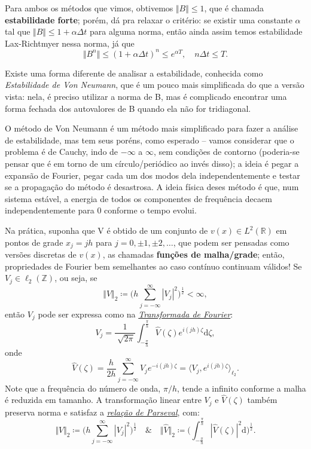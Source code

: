 \documentclass[../differential_methods.tex]{subfiles}
\begin{document}
Para ambos os métodos que vimos, obtivemos \(\Vert B \Vert \leq 1\), que é chamada \textbf{estabilidade forte}; porém, dá pra relaxar o critério: se existir uma constante \(\alpha \) tal que \(\Vert B \Vert \leq 1 + \alpha \Delta t\) para alguma norma, então ainda assim temos estabilidade Lax-Richtmyer nessa norma, já que
\[
	\Vert B^{n} \Vert \leq (1+\alpha \Delta t)^{n} \leq e^{\alpha T}, \quad n\Delta t\leq T.
\]

Existe uma forma diferente de analisar a estabilidade, conhecida como \textit{Estabilidade de Von Neumann}, que é um pouco mais simplificada do que a versão vista: nela, é preciso utilizar a norma de B, mas é complicado encontrar uma forma fechada dos autovalores de B quando ela não for tridiagonal.

O método de Von Neumann é um método mais simplificado para fazer a análise de estabilidade, mas tem seus poréns, como esperado -- vamos considerar que o problema é de Cauchy, indo de \(-\infty\) a \(\infty\), sem condições de contorno (poderia-se pensar que é em torno de um círculo/periódico ao invés disso); a ideia é pegar a expansão de Fourier, pegar cada um dos modos dela independentemente e testar se a propagação do método é desastrosa.
A ideia física deses método é que, num sistema estável, a energia de todos os componentes de frequência decaem independentemente para 0 conforme o tempo evolui.

Na prática, suponha que V é obtido de um conjunto de \(v(x)\in L^{2}(\mathbb{R})\) em pontos de grade \(x_{j}=jh\) para \(j=0, \pm 1, \pm 2, \dotsc \), que podem ser pensadas como versões discretas de \(v(x)\), as chamadas \textbf{funções de malha/grade}; então, propriedades de Fourier bem semelhantes ao caso contínuo continuam válidos!
Se \(V_{j}\in \ell_{2}(\mathbb{Z})\), ou seja, se
\[
	\Vert V \Vert_{2}\coloneqq \biggl(h \sum\limits_{j=-\infty}^{\infty}| V_{j} |^{2}\biggr)^{\frac{1}{2}} < \infty,
\]
então \(V_{j}\) pode ser expressa como na \hyperlink{fourier_transform}{\textit{Transformada de Fourier}}:
\[
	V_{j} = \frac{1}{\sqrt[]{2\pi }}\int_{-\frac{\pi }{h}}^{\frac{\pi }{h}}\hat{V}(\zeta )e^{i(jh)\zeta } \mathrm{d}\zeta,
\]
onde
\[
	\hat{V}(\zeta ) = \frac{h}{2h}\sum\limits_{j=-\infty}^{\infty}V_{j}e^{-i(jh)\zeta } = \langle V_{j}, e^{i(jh)\zeta } \rangle_{\ell_{2}}.
\]
Note que a frequência do número de onda, \(\pi /h\), tende a infinito conforme a malha é reduzida em tamanho.
A transformação linear entre \(V_{j}\) e \(\hat{V}(\zeta )\) também preserva norma e satisfaz a \hyperlink{parseval_relation}{\textit{relação de Parseval}}, com:
\[
	\Vert V \Vert_{2} \coloneqq \biggl(h \sum\limits_{j=-\infty}^{\infty}| V_{j} |^{2}\biggr)^{\frac{1}{2}} \quad\&\quad \Vert \hat{V} \Vert_{2}\coloneqq \biggl(\int_{-\frac{\pi }{h}}^{\frac{\pi }{h}}| \hat{V}(\zeta ) |^{2} \mathrm{d}\biggr)^{\frac{1}{2}}.
\]
\end{document}

